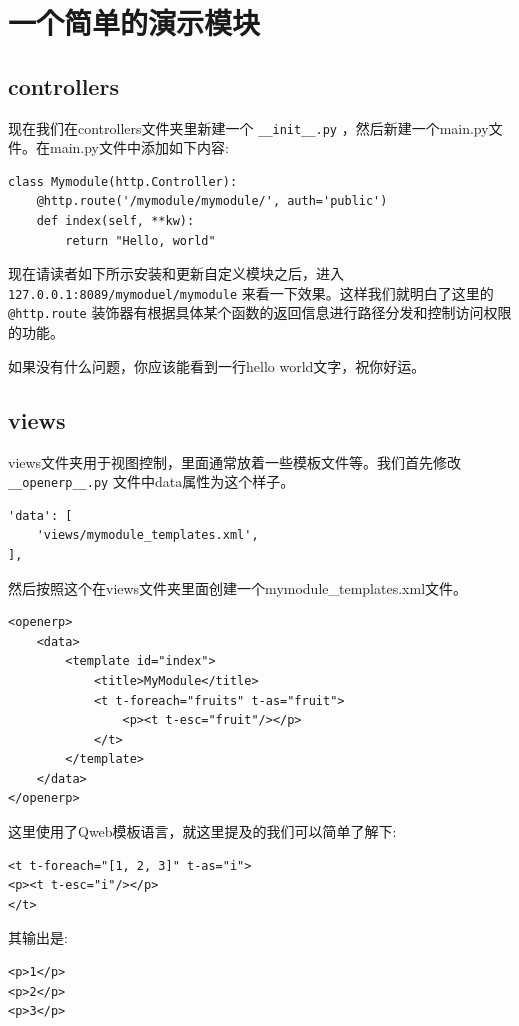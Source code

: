 \documentclass[11pt,a4paper]{sphinxmanual}
\begin{document}
\section{一个简单的演示模块}
\label{sec-5-3}

\subsection{controllers}
\label{sec-5-3-1}
现在我们在controllers文件夹里新建一个 \verb~__init__.py~ ，然后新建一个main.py文件。在main.py文件中添加如下内容:

\begin{verbatim}
class Mymodule(http.Controller):
    @http.route('/mymodule/mymodule/', auth='public')
    def index(self, **kw):
        return "Hello, world"
\end{verbatim}

现在请读者如下所示安装和更新自定义模块之后，进入 \verb~127.0.0.1:8089/mymoduel/mymodule~ 来看一下效果。这样我们就明白了这里的 \verb~@http.route~ 装饰器有根据具体某个函数的返回信息进行路径分发和控制访问权限的功能。

如果没有什么问题，你应该能看到一行hello world文字，祝你好运。



\subsection{views}
\label{sec-5-3-2}
views文件夹用于视图控制，里面通常放着一些模板文件等。我们首先修改 \verb~__openerp__.py~ 文件中data属性为这个样子。
\begin{Verbatim}
'data': [
    'views/mymodule_templates.xml',
],
\end{Verbatim}

然后按照这个在views文件夹里面创建一个mymodule\_templates.xml文件。
\begin{verbatim}
<openerp>
    <data>
        <template id="index">
            <title>MyModule</title>
            <t t-foreach="fruits" t-as="fruit">
                <p><t t-esc="fruit"/></p>
            </t>
        </template>
    </data>
</openerp>
\end{verbatim}

这里使用了Qweb模板语言，就这里提及的我们可以简单了解下:
\begin{Verbatim}
<t t-foreach="[1, 2, 3]" t-as="i">
<p><t t-esc="i"/></p>
</t>
\end{Verbatim}

其输出是:
\begin{Verbatim}
<p>1</p>
<p>2</p>
<p>3</p>
\end{Verbatim}
\end{document}
